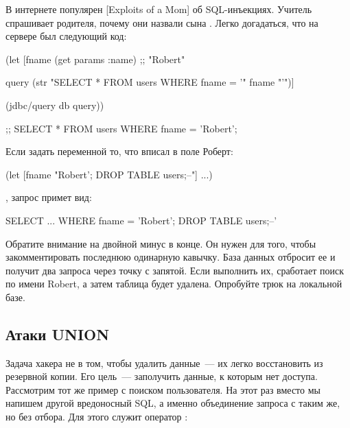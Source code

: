 \def\urlxkcdsql{https://xkcd.com/327/}

В интернете популярен \footurl{комикс Xkcd}{\urlxkcdsql}[Exploits of a Mom] об SQL-инъекциях. Учитель спрашивает родителя, почему они назвали сына . Легко догадаться, что на сервере был следующий код:

\begin{english}
  \begin{clojure}
(let [fname
      (get params :name) ;; "Robert"

      query
      (str "SELECT * FROM users WHERE fname = '"
           fname
           "'")]

  (jdbc/query db query))

;; SELECT * FROM users WHERE fname = 'Robert';
  \end{clojure}
\end{english}

Если задать переменной  то, что вписал в поле Роберт:

\begin{english}
  \begin{clojure}
(let [fname "Robert'; DROP TABLE users;--"]
  ...)
  \end{clojure}
\end{english}

\noindent
, запрос примет вид:

\begin{english}
  \begin{sql}
SELECT ... WHERE fname = 'Robert'; DROP TABLE users;--'
  \end{sql}
\end{english}

Обратите внимание на двойной минус в конце. Он нужен для того, чтобы закомментировать последнюю одинарную кавычку. База данных отбросит ее и получит два запроса через точку с запятой. Если выполнить их, сработает поиск по имени Robert, а затем таблица  будет удалена. Опробуйте трюк на локальной базе.

\subsection{Атаки UNION}

Задача хакера не в том, чтобы удалить данные~--- их легко восстановить из резервной копии. Его цель~--- заполучить данные, к которым нет доступа. Рассмотрим тот же пример с поиском пользователя. На этот раз вместо  мы напишем другой вредоносный SQL, а именно объединение запроса с таким же, но без отбора. Для этого служит оператор :

